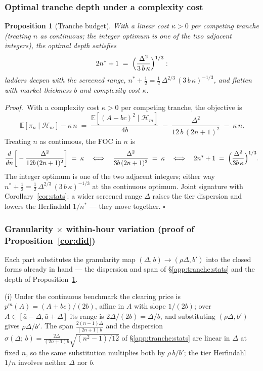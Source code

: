 \documentclass[11pt,a4paper]{article}
\newtheorem{proposition}{Proposition}
\theoremstyle{definition}
\theoremstyle{remark}
\theoremstyle{plain}
\begin{document}
\subsubsection{Optimal tranche depth under a complexity cost}\label{app:tranche:budget}

\begin{proposition}[Tranche budget]\label{prop:budget}
With a linear cost $\kappa > 0$ per competing tranche (treating $n$ as continuous; the integer optimum is one of the two adjacent integers), the optimal depth satisfies
\[
2 n^* + 1 \;=\; \Bigl(\frac{\Delta^2}{3\, b\, \kappa}\Bigr)^{1/3}:
\]
ladders deepen with the screened range, $n^* + \tfrac12 = \tfrac12\,\Delta^{2/3}\,(3\,b\,\kappa)^{-1/3}$, and flatten with market thickness $b$ and complexity cost $\kappa$.
\end{proposition}

\noindent\textit{Proof.}\ With a complexity cost $\kappa > 0$ per competing tranche, the objective is
\[
\mathbb{E}[\pi_n \mid \mathcal{H}_m] - \kappa\,n \;=\; \frac{\mathbb{E}[(A - bc)^2 \mid \mathcal{H}_m]}{4 b} \;-\; \frac{\Delta^2}{12\,b\,(2n+1)^2} \;-\; \kappa\,n.
\]
Treating $n$ as continuous, the FOC in $n$ is
\[
\frac{d}{dn}\bigg[-\frac{\Delta^2}{12 b\,(2n+1)^2}\bigg] \;=\; \kappa
\quad\Longleftrightarrow\quad
\frac{\Delta^2}{3 b\,(2n+1)^3} \;=\; \kappa
\quad\Longleftrightarrow\quad
2 n^* + 1 \;=\; \Bigl(\frac{\Delta^2}{3 b\,\kappa}\Bigr)^{1/3}.
\]
The integer optimum is one of the two adjacent integers; either way $n^* + \tfrac{1}{2} = \tfrac{1}{2}\,\Delta^{2/3}\,(3\,b\,\kappa)^{-1/3}$ at the continuous optimum. Joint signature with Corollary~\ref{cor:stats}: a wider screened range $\Delta$ raises the tier dispersion and lowers the Herfindahl $1/n^*$ --- they move together. $\square$

\subsubsection{Granularity $\times$ within-hour variation (proof of Proposition~\ref{cor:did})}\label{app:tranche:did}

Each part substitutes the granularity map $(\Delta, b) \to (\rho\Delta, b')$ into the closed forms already in hand --- the dispersion and span of \S\ref{app:tranche:stats} and the depth of Proposition~\ref{prop:budget}.

(i) Under the continuous benchmark the clearing price is $p^m(A) = (A + bc)/(2b)$, affine in $A$ with slope $1/(2b)$; over $A \in [\bar a - \Delta, \bar a + \Delta]$ its range is $2\Delta/(2b) = \Delta/b$, and substituting $(\rho\Delta, b')$ gives $\rho\Delta/b'$. The span $\tfrac{2(n-1)\Delta}{(2n+1) b}$ and the dispersion $\sigma(\Delta;\,b) = \tfrac{2\Delta}{(2n+1) b}\sqrt{(n^2-1)/12}$ of \S\ref{app:tranche:stats} are linear in $\Delta$ at fixed $n$, so the same substitution multiplies both by $\rho\,b/b'$; the tier Herfindahl $1/n$ involves neither $\Delta$ nor $b$.
\end{document}
